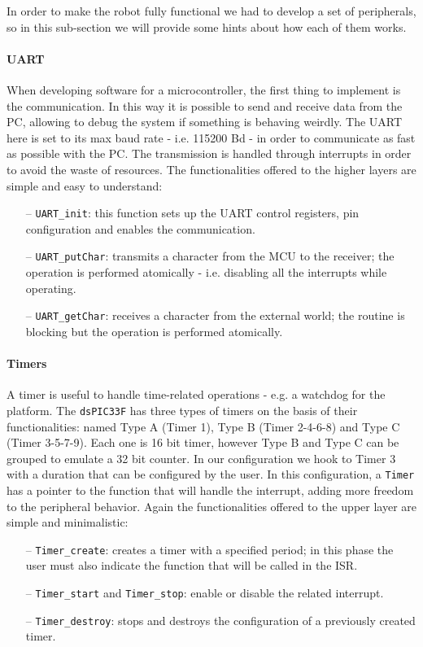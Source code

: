 \documentclass[10pt,a4paper, notitlepage]{report}
\begin{document}
In order to make the robot fully functional we had to develop a set of peripherals, so in this sub-section we will provide some hints about how each of them works.
\paragraph*{UART}
When developing software for a microcontroller, the first thing to implement is the communication. In this way it is possible to send and receive data from the PC, allowing to debug the system if something is behaving weirdly. 
The UART here is set to its max baud rate - i.e. 115200 Bd - in order to communicate as fast as possible with the PC. The transmission is handled through interrupts in order to avoid the waste of resources. The functionalities offered to the higher layers are simple and easy to understand:
\begin{itemize}
  \item[--] \texttt{UART\_init}: this function sets up the UART control registers, pin configuration and enables the communication.
  \item[--] \texttt{UART\_putChar}: transmits a character from the MCU to the receiver; the operation is performed atomically - i.e. disabling all the interrupts while operating.
  \item[--] \texttt{UART\_getChar}: receives a character from the external world; the routine is blocking but the operation is performed atomically.
\end{itemize}
\paragraph*{Timers}
A timer is useful to handle time-related operations - e.g. a watchdog for the platform. The \texttt{dsPIC33F} has three types of timers on the basis of their functionalities: named Type A (Timer 1), Type B (Timer 2-4-6-8) and Type C (Timer 3-5-7-9). Each one is 16 bit timer, however Type B and Type C can be grouped to emulate a 32 bit counter. In our configuration we hook to Timer 3 with a duration that can be configured by the user. In this configuration, a \texttt{Timer} has a pointer to the function that will handle the interrupt, adding more freedom to the peripheral behavior. Again the functionalities offered to the upper layer are simple and minimalistic:
\begin{itemize}
  \item[--] \texttt{Timer\_create}: creates a timer with a specified period; in this phase the user must also indicate the function that will be called in the ISR.
  \item[--] \texttt{Timer\_start} and \texttt{Timer\_stop}: enable or disable the related interrupt.
  \item[--] \texttt{Timer\_destroy}: stops and destroys the configuration of a previously created timer.
\end{itemize}
\end{document}
